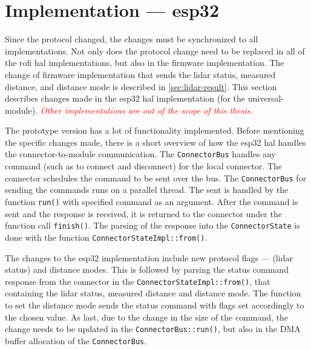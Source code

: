 \documentclass[
  digital,     %
  oneside,     %
  nosansbold,  %
  nocolorbold, %
  nolof,         %
  nolot,         %
]{fithesis4}
\newcommand{\TODO}[1]{\textcolor{red}{\textit{#1}}}
\newcommand{\TODOLIST}[1]{}
\begin{document}
{{{\section{ Implementation --- esp32 }
\TODOLIST{
\begin{itemize}
    \item Apply changes from interface --- lidar status, distance and \TODO{distance modes}
    \item Issue $\rightarrow$ status is not being updated $\rightarrow$ Needed to implement poller
\end{itemize}
}

Since the protocol changed, the changes must be synchronized to all implementations. Not only does the protocol change need to be replaced in all of the \acrshort{rofi} \acrshort{hal} implementations, but also in the firmware implementation. The change of firmware implementation that sends the \acrshort{lidar} status, measured distance, and distance mode is described in \autoref{sec:lidar-result}. This section describes changes made in the esp32 \acrshort{hal} implementation (for the \gls{universal-module}). \TODO{Other implementations are out of the scope of this thesis.}

The prototype version has a lot of functionality implemented. Before mentioning the specific changes made, there is a short overview of how the esp32 \acrshort{hal} handles the connector-to-module communication. The \lstinline|ConnectorBus| handles any command (such as to connect and disconnect) for the local connector. The connector schedules the command to be sent over the bus. The \lstinline|ConnectorBus| for sending the commands runs on a parallel thread. The sent is handled by the function \lstinline|run()| with specified command as an argument. After the command is sent and the response is received, it is returned to the connector under the function call \lstinline|finish()|. The parsing of the response into the \lstinline|ConnectorState| is done with the function \lstinline|ConnectorStateImpl::from()|.

The changes to the esp32 implementation include new protocol flags --- (\acrshort{lidar} status) and distance modes. This is followed by parsing the status command response from the connector in the \lstinline|ConnectorStateImpl::from()|, that containing the \acrshort{lidar} status, measured distance and distance mode. The function to set the distance mode sends the status command with flags set accordingly to the chosen value. As last, due to the change in the size of the command, the change needs to be updated in the \lstinline|ConnectorBus::run()|, but also in the DMA buffer allocation of the \lstinline|ConnectorBus|.

}}}
\end{document}
